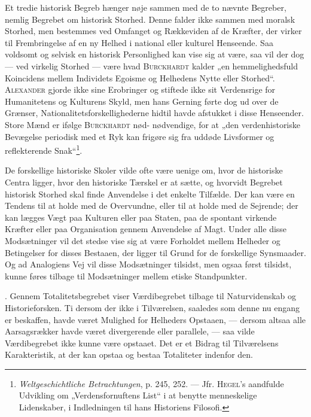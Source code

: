 \documentclass[12pt]{article}
\newcommand{\opage}[1]{\marginnote{\footnotesize\textit{[#1]}}}
\begin{document}
Et tredie historisk Begreb hænger nøje sammen med de to nævnte Begreber, nemlig
Begrebet om historisk Storhed. Denne falder ikke sammen med moralsk Storhed, men
bestemmes ved Omfanget og Rækkeviden af de Kræfter, der virker til Frembringelse
af en ny Helhed i national eller kulturel Henseende. Saa voldsomt og selvisk en
historisk Personlighed kan vise sig at være, saa vil der dog --- ved virkelig
Storhed --- være hvad \textsc{Burckhardt} kalder „en hemmelighedsfuld Koincidens
mellem Individets Egoisme og Helhedens Nytte eller Storhed“. \textsc{Alexander}
gjorde ikke sine Erobringer og stiftede ikke sit Verdensrige for Humanitetens og
Kulturens Skyld, men hans Gerning førte dog ud over de Grænser,
Nationalitetsforskellighederne hidtil havde afstukket i disse Henseender. Store
Mænd er ifølge \textsc{Burckhardt} nød-%
\setcounter{footnote}{0}%
\opage{72}nødvendige, for at „den verdenhistoriske Bevægelse periodisk med et
Ryk kan frigøre sig fra uddøde Livsformer og reflekterende
Snak“\footnote{\textit{Weltgeschichtliche Betrachtungen}, p. 245, 252. --- Jfr.
\textsc{Hegel}'s aandfulde Udvikling om „Verdensfornuftens List“ i at benytte
menneskelige Lidenskaber, i Indledningen til hans Historiens Filosofi.}.

De forskellige historiske Skoler vilde ofte være uenige om, hvor de historiske
Centra ligger, hvor den historiske Tærskel er at sætte, og hvorvidt Begrebet
historisk Storhed skal finde Anvendelse i det enkelte Tilfælde. Der kan være en
Tendens til at holde med de Overvundne, eller til at holde med de Sejrende; der
kan lægges Vægt paa Kulturen eller paa Staten, paa de spontant virkende Kræfter
eller paa Organisation gennem Anvendelse af Magt. Under alle disse Modsætninger
vil det stedse vise sig at være Forholdet mellem Helheder og Betingelser for
disses Bestaaen, der ligger til Grund for de forskellige Synsmaader. Og ad
Analogiens Vej vil disse Modsætninger tilsidst, men ogsaa først tilsidst, kunne
føres tilbage til Modsætninger mellem etiske Standpunkter.

. Gennem Totalitetsbegrebet viser Værdibegrebet tilbage til Naturvidenskab og
Historieforsken. Ti dersom der ikke i Tilværelsen, saaledes som denne nu engang
er beskaffen, havde været Mulighed for Helheders Opstaaen, --- dersom altsaa
alle Aarsagsrækker havde været divergerende eller parallele, --- saa vilde
Værdibegrebet ikke kunne være opstaaet. Det er et Bidrag til Tilværelsens
Karakteristik, at der kan opstaa og bestaa Totaliteter indenfor den.
\end{document}

